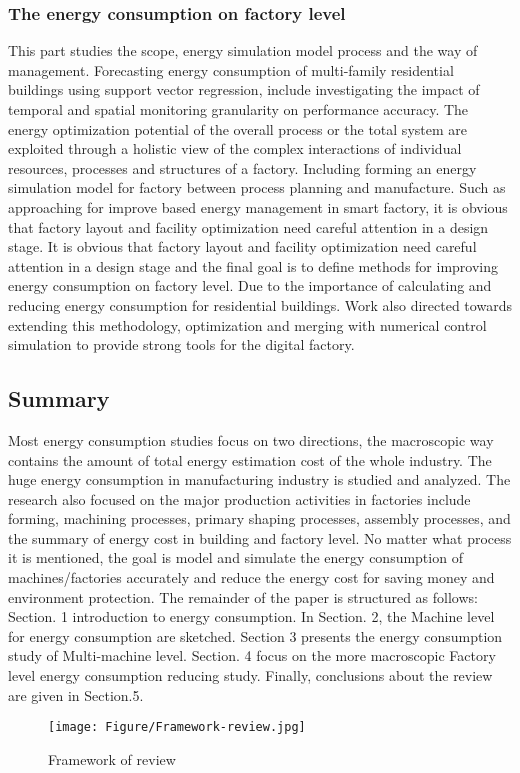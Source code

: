 \subsubsection{The energy consumption on factory level}

This part studies the scope, energy simulation model process and the way of management. Forecasting energy consumption of multi-family residential buildings using support vector regression, include investigating the impact of temporal and spatial monitoring granularity on performance accuracy. The energy optimization potential of the overall process or the total system are exploited through a holistic view of the complex interactions of individual resources, processes and structures of a factory. Including forming an energy simulation model for factory between process planning and manufacture. Such as approaching for improve based energy management in smart factory, it is obvious that factory layout and facility optimization need careful attention in a design stage. It is obvious that factory layout and facility optimization need careful attention in a design stage and the final goal is to define methods for improving energy consumption on factory level. Due to the importance of calculating and reducing energy consumption for residential buildings. Work also directed towards extending this methodology, optimization and merging with numerical control simulation to provide strong tools for the digital factory.

\subsection{Summary}

Most energy consumption studies focus on two directions, the macroscopic way contains the amount of total energy estimation cost of the whole industry. The huge energy consumption in manufacturing industry is studied and analyzed. The research also focused on the major production activities in factories include forming, machining processes, primary shaping processes, assembly processes, and the summary of energy cost in building and factory level. No matter what process it is mentioned, the goal is model and simulate the energy consumption of machines/factories accurately and reduce the energy cost for saving money and environment protection. The remainder of the paper is structured as follows: Section. 1 introduction to energy consumption. In Section. 2, the Machine level for energy consumption are sketched. Section 3 presents the energy consumption study of Multi-machine level. Section. 4 focus on the more macroscopic Factory level energy consumption reducing study. Finally, conclusions about the review are given in Section.5.

\begin{figure}[h!]
	\centering
	\texttt{[image: Figure/Framework-review.jpg]}
	\caption{Framework of review}
	\label{fig:FrameworkReview}
\end{figure}
